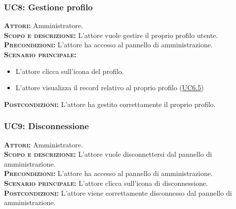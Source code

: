 \subsubsection{UC8: Gestione profilo}
\label{sec:UC8}
\textsc{\textbf{Attori:}} Amministratore.\\
\textsc{\textbf{Scopo e descrizione:}} L'attore vuole gestire il proprio profilo utente.\\
\textsc{\textsc{\textbf{Precondizioni:}}} L'attore ha accesso al pannello di amministrazione.\\
\textsc{\textbf{Scenario principale:}}
\begin{itemize}
    \item L'attore clicca sull'icona del profilo.
    \item L'attore visualizza il record relativo al proprio profilo (\hyperref[sec:UC65]{UC6.5})
\end{itemize}
\textsc{\textbf{Postcondizioni:}} L'attore ha gestito correttamente il proprio profilo.

\subsubsection{UC9: Disconnessione}
\label{sec:UC9}
\textsc{\textbf{Attori:}} Amministratore.\\
\textsc{\textbf{Scopo e descrizione:}} L'attore vuole disconnettersi dal pannello di amministrazione.\\
\textsc{\textsc{\textbf{Precondizioni:}}} L'attore ha accesso al pannello di amministrazione.\\
\textsc{\textbf{Scenario principale:}} L'attore clicca sull'icona di disconnessione.\\
\textsc{\textbf{Postcondizioni:}} L'attore viene correttamente disconnesso dal pannello di amministrazione.

